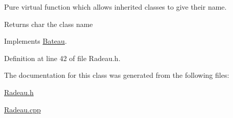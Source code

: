 Pure virtual function which allows inherited classes to give their name. 

\begin{DoxyReturn}{Returns}
char the class name 
\end{DoxyReturn}


Implements \hyperlink{class_bateau_ad6775916a45ddbe18a9f06df79e2ba6f}{Bateau}.



Definition at line 42 of file Radeau.h.



The documentation for this class was generated from the following files:\begin{DoxyCompactItemize}
\item 
\hyperlink{_radeau_8h}{Radeau.h}\item 
\hyperlink{_radeau_8cpp}{Radeau.cpp}\end{DoxyCompactItemize}
